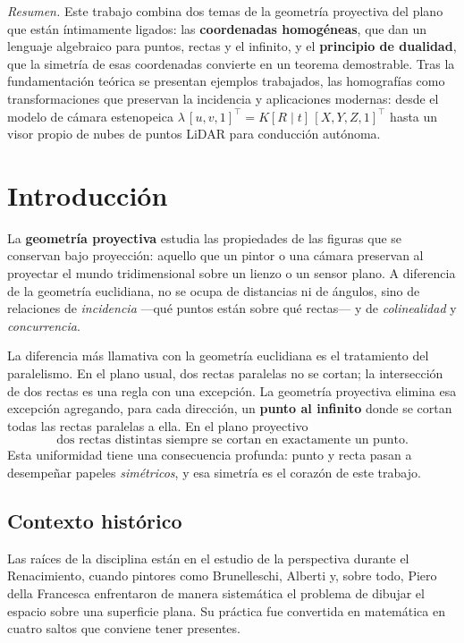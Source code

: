 \documentclass[11pt,a4paper]{article}
\begin{document}
\noindent\color{gris}\small
\textit{Resumen.} Este trabajo combina dos temas de la geometría proyectiva
del plano que están íntimamente ligados: las \textbf{coordenadas
homogéneas}, que dan un lenguaje algebraico para puntos, rectas y el
infinito, y el \textbf{principio de dualidad}, que la simetría de esas
coordenadas convierte en un teorema demostrable. Tras la fundamentación
teórica se presentan ejemplos trabajados, las homografías como
transformaciones que preservan la incidencia y aplicaciones modernas:
desde el modelo de cámara estenopeica $\lambda\,[u,v,1]^\top=K[R\mid t]\,[X,Y,Z,1]^\top$
hasta un visor propio de nubes de puntos LiDAR para conducción autónoma.
\color{black}

\clearpage

\section{Introducción}

La \textbf{geometría proyectiva} estudia las propiedades de las figuras que
se conservan bajo proyección: aquello que un pintor o una cámara preservan
al proyectar el mundo tridimensional sobre un lienzo o un sensor plano. A
diferencia de la geometría euclidiana, no se ocupa de distancias ni de
ángulos, sino de relaciones de \emph{incidencia} —qué puntos están sobre
qué rectas— y de \emph{colinealidad} y \emph{concurrencia}.

La diferencia más llamativa con la geometría euclidiana es el tratamiento
del paralelismo. En el plano usual, dos rectas paralelas no se cortan; la
intersección de dos rectas es una regla con una excepción. La geometría
proyectiva elimina esa excepción agregando, para cada dirección, un
\textbf{punto al infinito} donde se cortan todas las rectas paralelas a
ella. En el plano proyectivo
\[
  \text{dos rectas distintas siempre se cortan en exactamente un punto.}
\]
Esta uniformidad tiene una consecuencia profunda: punto y recta pasan a
desempeñar papeles \emph{simétricos}, y esa simetría es el corazón de este
trabajo.

\subsection{Contexto histórico}
\label{sec:historia}

Las raíces de la disciplina están en el estudio de la perspectiva durante
el Renacimiento, cuando pintores como Brunelleschi, Alberti y, sobre todo,
Piero della Francesca enfrentaron de manera sistemática el problema de
dibujar el espacio sobre una superficie plana. Su práctica fue convertida en
matemática en cuatro saltos que conviene tener presentes.
\end{document}

